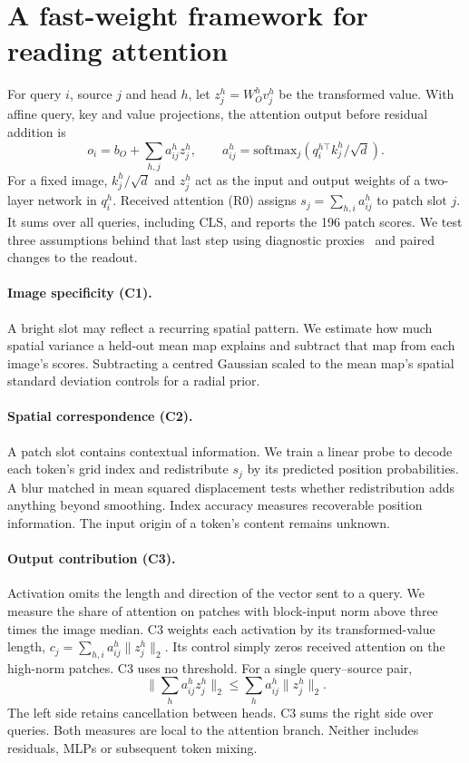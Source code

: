 \documentclass{article}
\begin{document}
\section{A fast-weight framework for reading attention}
\label{sec:method}
For query $i$, source $j$ and head $h$, let $z_j^h=W_O^h v_j^h$ be the transformed value. With affine query, key and value projections, the attention output before residual addition is
\begin{equation}
 o_i=b_O+\sum_{h,j}a^h_{ij}z^h_j,\qquad
 a^h_{ij}=\mathrm{softmax}_j(q_i^{h\top}k_j^h/\sqrt{d}).
\label{eq:attn}
\end{equation}
For a fixed image, $k_j^h/\sqrt d$ and $z_j^h$ act as the input and output weights of a two-layer network in $q_i^h$. Received attention (R0) assigns $s_j=\sum_{h,i}a^h_{ij}$ to patch slot $j$. It sums over all queries, including CLS, and reports the 196 patch scores. We test three assumptions behind that last step using diagnostic proxies~\citep{bau2017} and paired changes to the readout.

\paragraph{Image specificity (C1).} A bright slot may reflect a recurring spatial pattern. We estimate how much spatial variance a held-out mean map explains and subtract that map from each image's scores. Subtracting a centred Gaussian scaled to the mean map's spatial standard deviation controls for a radial prior.

\paragraph{Spatial correspondence (C2).} A patch slot contains contextual information. We train a linear probe to decode each token's grid index and redistribute $s_j$ by its predicted position probabilities. A blur matched in mean squared displacement tests whether redistribution adds anything beyond smoothing. Index accuracy measures recoverable position information. The input origin of a token's content remains unknown.

\paragraph{Output contribution (C3).} Activation omits the length and direction of the vector sent to a query. We measure the share of attention on patches with block-input norm above three times the image median. C3 weights each activation by its transformed-value length, $c_j=\sum_{h,i}a_{ij}^h\|z_j^h\|_2$. Its control simply zeros received attention on the high-norm patches. C3 uses no threshold. For a single query--source pair,
\[
 \Big\|\sum_h a^h_{ij} z_j^h\Big\|_2 \leq \sum_h a^h_{ij}\|z_j^h\|_2.
\]
The left side retains cancellation between heads. C3 sums the right side over queries. Both measures are local to the attention branch. Neither includes residuals, MLPs or subsequent token mixing.
\clearpage
\end{document}
